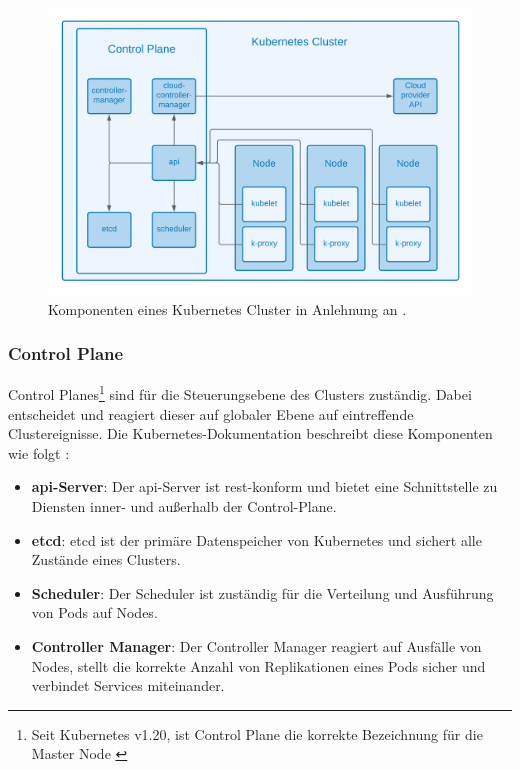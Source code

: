 \begin{figure}
    \centering
    \includegraphics[width=1.0\columnwidth]{images/KubernetesKomponenten.png}
    \caption{Komponenten eines Kubernetes Cluster in Anlehnung an \cite{kuberneteskomponenten}.}
    \label{fig:cluster}
\end{figure}

\subsubsection{Control Plane}
Control Planes\footnote{Seit Kubernetes v1.20, ist Control Plane die korrekte Bezeichnung für die Master Node \cite{Kuberneteschangemaster}} sind für die Steuerungsebene des Clusters zuständig.
Dabei entscheidet und reagiert dieser auf globaler Ebene auf eintreffende Clustereignisse.
Die Kubernetes-Dokumentation beschreibt diese Komponenten wie folgt \cite{kuberneteskomponenten}:

\begin{itemize}
  \item \textbf{\acs{api}-Server}: Der \acs{api}-Server ist \acs{rest}-konform und bietet eine Schnittstelle zu Diensten
  inner- und außerhalb der Control-Plane.
  \item \textbf{etcd}: etcd ist der primäre Datenspeicher von Kubernetes und sichert alle Zustände eines Clusters.
  \item \textbf{Scheduler}: Der Scheduler ist zuständig für die Verteilung und Ausführung von Pods auf Nodes.
  \item \textbf{Controller Manager}: Der Controller Manager reagiert auf Ausfälle von Nodes, stellt die korrekte Anzahl von Replikationen eines Pods sicher und verbindet Services miteinander.
\end{itemize}

